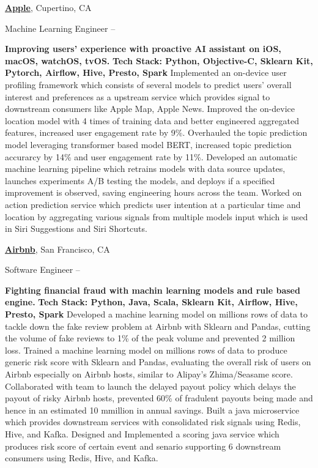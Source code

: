 \documentclass[a4paper,MMMyyyy,nonstopmode]{simpleresumecv}
\begin{document}
\begin{Body}
\BigGap
\Entry
\href{https://www.apple.com/}
{\textbf{Apple}},
Cupertino, CA

\Gap
\BulletItem
Machine Learning Engineer
\hfill
{} --
\begin{Detail}
\SubBulletItem
\textbf{Improving users' experience with proactive AI assistant on iOS, macOS, watchOS, tvOS.}
\SubBulletItem \textbf{Tech Stack: Python, Objective-C, Sklearn Kit, Pytorch, Airflow, Hive, Presto, Spark}
\SubBulletItem
Implemented an on-device user profiling framework which consists of several models to predict users' overall interest and preferences as a upstream service which provides signal to downstream consumers like Apple Map, Apple News.
\SubBulletItem
Improved the on-device location model with 4 times of training data and better engineered aggregated features, increased user engagement rate by 9\%.
\SubBulletItem
Overhauled the topic prediction model leveraging transformer based model BERT, increased topic prediction accurarcy by 14\% and user engagement rate by 11\%.
\SubBulletItem
Developed an automatic machine learning pipeline which retrains models with data source updates, launches experiments A/B testing the models, and deploys if a specified improvement is observed, saving engineering hours across the team.
\SubBulletItem
Worked on action prediction service which predicts user intention at a particular time and location by aggregating various signals from multiple models input which is used in Siri Suggestions and Siri Shortcuts.
\end{Detail}

\BigGap
\Entry
\href{https://press.airbnb.com/about-us/}
{\textbf{Airbnb}},
San Francisco, CA

\Gap
\BulletItem
Software Engineer
\hfill
{} --
\begin{Detail}
\SubBulletItem
\textbf{Fighting financial fraud with machin learning models and rule based engine.}
\SubBulletItem \textbf{Tech Stack: Python, Java, Scala, Sklearn Kit, Airflow, Hive, Presto, Spark}
\SubBulletItem
Developed a machine learning model on millions rows of data to tackle down the fake review problem at Airbnb with Sklearn and Pandas, cutting the volume of fake reviews to 1\% of the peak volume and prevented 2 million loss.
\SubBulletItem
Trained a machine learning model on millions rows of data to produce generic risk score with Sklearn and Pandas, evaluating the overall risk of users on Airbnb especially on Airbnb hosts, similar to Alipay's Zhima/Seasame score.
\SubBulletItem
Collaborated with team to launch the delayed payout policy which delays the payout of risky Airbnb hosts, prevented 60\% of fradulent payouts being made and hence in an estimated 10 mmillion in annual savings.
\SubBulletItem
Built a java microservice which provides downstream services with consolidated risk signals using Redis, Hive, and Kafka.
\SubBulletItem
Designed and Implemented a scoring java service which produces risk score of certain event and senario supporting 6 downstream consumers using Redis, Hive, and Kafka.
\end{Detail}


\end{Body}
\end{document}
